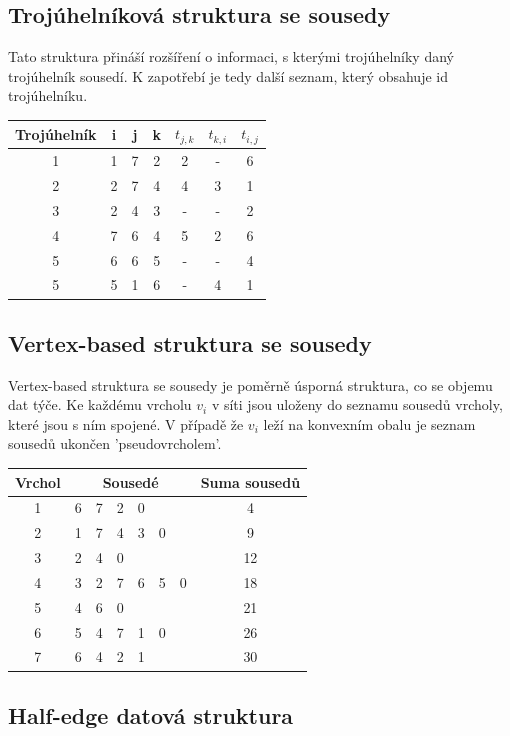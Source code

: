 \documentclass[12pt,a4paper]{article}
\begin{document}
\subsection{Trojúhelníková struktura se sousedy}

Tato struktura přináší rozšíření o informaci, s kterými trojúhelníky daný trojúhelník sousedí. K zapotřebí je tedy další seznam, který obsahuje id trojúhelníku.

\begin{tabular}{|c||c|c|c||c|c|c|}
\hline
Trojúhelník & i & j & k & $t_{j,k}$ & $t_{k,i}$ & $t_{i,j}$\\
\hline
1 & 1 & 7 & 2 & 2 & - & 6\\
2 & 2 & 7 & 4 & 4 & 3 & 1\\
3 & 2 & 4 & 3 & - & - & 2\\
4 & 7 & 6 & 4 & 5 & 2 & 6\\
5 & 6 & 6 & 5 & - & - & 4\\
5 & 5 & 1 & 6 & - & 4 & 1\\
\hline
\end{tabular}


\subsection{Vertex-based struktura se sousedy}

Vertex-based struktura se sousedy je poměrně úsporná struktura, co se objemu dat týče. Ke každému vrcholu $v_i$ v síti jsou uloženy do seznamu sousedů vrcholy, které jsou s ním spojené. V případě že $v_i$ leží na konvexním obalu je seznam sousedů ukončen 'pseudovrcholem'. 

\begin{tabular}{|c||c|c|c|c|c|c||c|}
\hline
Vrchol & \multicolumn{6}{|c||}{Sousedé} & Suma sousedů\\
\hline
1 & 6 & 7 & 2 & 0 &   &   & 4\\
2 & 1 & 7 & 4 & 3 & 0 &   & 9\\
3 & 2 & 4 & 0 &   &   &   & 12\\
4 & 3 & 2 & 7 & 6 & 5 & 0 & 18\\
5 & 4 & 6 & 0 &   &   &   & 21\\
6 & 5 & 4 & 7 & 1 & 0 &   & 26\\
7 & 6 & 4 & 2 & 1 &   &   & 30\\
\hline
\end{tabular}

\subsection{Half-edge datová struktura}
\end{document}
